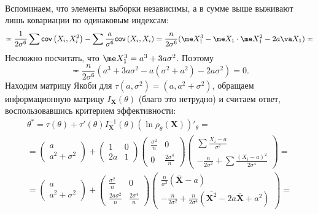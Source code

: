 \begin{example}
\begin{gather*}
    \end{gather*}
    Вспоминаем, что элементы выборки независимы, а в сумме выше выживают лишь ковариации по одинаковым индексам:
    \[
    \eqcirc
    \frac{1}{2\sigma^6}\sum \mathsf{cov}\left(X_i, X_i^2\right) - \sum\frac{a}{\sigma^6}\mathsf{cov}\left(X_i, X_i\right) = \frac{n}{2\sigma^6}(\me X_1^3 - \me X_1 \cdot \me X_1^2 - 2a\va X_1) \eqcirc
    \]
    Несложно посчитать, что $\me X_1^3 = a^3 + 3a\sigma^2$. Поэтому
    \[
    \eqcirc \frac{n}{2\sigma^6}(a^3+3a\sigma^2 - a(\sigma^2 + a^2) - 2a\sigma^2) = 0.
    \]
    Находим матрицу Якоби для $\tau(a, \sigma^2) = (a, a^2 + \sigma^2)$, обращаем информационную матрицу $I_{\mathbf X}(\theta)$ (благо это нетрудно) и считаем ответ, воспользовавшись критерием эффективности:
    \begin{gather*}
    \theta^* = \tau(\theta) + \tau'(\theta) I^{-1}_{\mathbf X}(\theta) (\ln{\rho_{\theta}(\mathbf X)})'_{\theta} = \\ 
    = \begin{pmatrix}a\\a^2+\sigma^2
    \end{pmatrix} + 
    \begin{pmatrix}
    1 & 0\\
    2a & 1
    \end{pmatrix}
    \begin{pmatrix}
    \frac{\sigma^2}{n} & 0\\
    0 & \frac{2\sigma^4}{n}
    \end{pmatrix}
    \begin{pmatrix}
    \sum \frac{X_i - a}{\sigma^2}\\
    -\frac{n}{2\sigma^2} + \sum \frac{(X_i-a)^2}{2\sigma^4}
    \end{pmatrix} = \\
    = \begin{pmatrix}a\\a^2+\sigma^2
    \end{pmatrix} + 
    \begin{pmatrix}
    \frac{\sigma^2}{n} & 0\\
    \frac{2a\sigma^2}{n} & \frac{2\sigma^4}{n}
    \end{pmatrix}
    \begin{pmatrix}
    \frac{n}{\sigma^2}(\overline{\mathbf X} - a)\\
    -\frac{n}{2\sigma^2} + \frac{n}{2\sigma^4}\left(\overline{\mathbf X^2} - 2a\overline{\mathbf X} + a^2\right)
    \end{pmatrix} =\\

\end{gather*}
\end{example}
